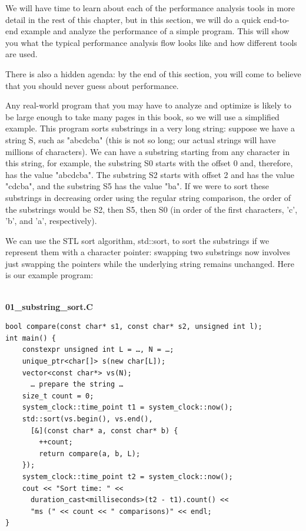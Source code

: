 We will have time to learn about each of the performance analysis tools in more detail in the rest of this chapter, but in this section, we will do a quick end-to-end example and analyze the performance of a simple program. This will show you what the typical performance analysis flow looks like and how different tools are used.

There is also a hidden agenda: by the end of this section, you will come to believe that you should never guess about performance.

Any real-world program that you may have to analyze and optimize is likely to be large enough to take many pages in this book, so we will use a simplified example. This program sorts substrings in a very long string: suppose we have a string S, such as "abcdcba" (this is not so long; our actual strings will have millions of characters). We can have a substring starting from any character in this string, for example, the substring S0 starts with the offset 0 and, therefore, has the value "abcdcba". The substring S2 starts with offset 2 and has the value "cdcba", and the substring S5 has the value "ba". If we were to sort these substrings in decreasing order using the regular string comparison, the order of the substrings would be S2, then S5, then S0 (in order of the first characters, 'c', 'b', and 'a', respectively).

We can use the STL sort algorithm, std::sort, to sort the substrings if we represent them with a character pointer: swapping two substrings now involves just swapping the pointers while the underlying string remains unchanged. Here is our example program:

\hspace*{\fill} \\ %
\noindent
\textbf{01\_substring\_sort.C}
\begin{lstlisting}[style=styleCXX]
bool compare(const char* s1, const char* s2, unsigned int l);
int main() {
	constexpr unsigned int L = …, N = …;
	unique_ptr<char[]> s(new char[L]);
	vector<const char*> vs(N);
	  … prepare the string …
	size_t count = 0;
	system_clock::time_point t1 = system_clock::now();
	std::sort(vs.begin(), vs.end(),
	  [&](const char* a, const char* b) {
		++count;
		return compare(a, b, L);
	});
	system_clock::time_point t2 = system_clock::now();
	cout << "Sort time: " <<
	  duration_cast<milliseconds>(t2 - t1).count() <<
	  "ms (" << count << " comparisons)" << endl;
}
\end{lstlisting}

